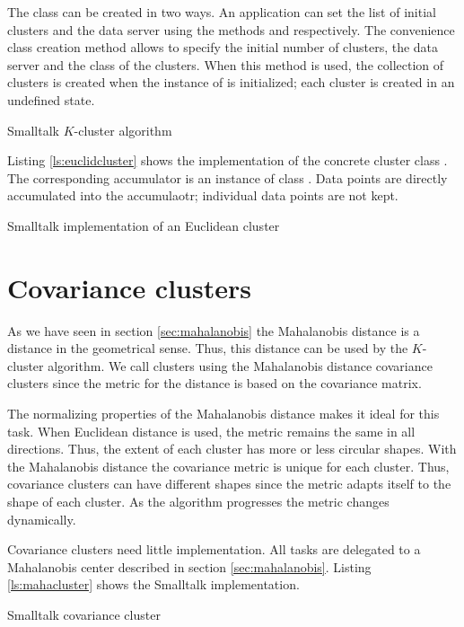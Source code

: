 The class  can be created in two ways. An
application can set the list of initial clusters and the data
server using the methods  and 
respectively. The convenience class creation method  allows to specify the initial number of
clusters, the data server and the class of the clusters.
When this method is used, the collection of clusters is created when the
instance of  is initialized; each cluster is
created in an undefined state.

\begin{listing} Smalltalk $K$-cluster algorithm \label{ls:clusterfinder}


\end{listing}
Listing \ref{ls:euclidcluster} shows the implementation of the
concrete cluster class .
The corresponding accumulator is an instance of class . Data points are directly accumulated into
the accumulaotr; individual data points are not kept.
\begin{listing} Smalltalk implementation of an Euclidean cluster \label{ls:euclidcluster}

\end{listing}

\section{Covariance clusters}
\label{sec:mahalanobiscluster} As we have seen in section
\ref{sec:mahalanobis} the Mahalanobis distance is a distance in
the geometrical sense. Thus, this distance can be used by the
$K$-cluster algorithm. We call clusters using the Mahalanobis
distance covariance clusters since the metric for the distance is
based on the covariance matrix.

The normalizing properties of the Mahalanobis distance makes it
ideal for this task. When Euclidean distance is used, the metric
remains the same in all directions. Thus, the extent of each
cluster has more or less circular shapes. With the Mahalanobis
distance the covariance metric is unique for each cluster. Thus,
covariance clusters can have different shapes since the metric
adapts itself to the shape of each cluster. As the algorithm
progresses the metric changes dynamically.

 Covariance clusters need little
implementation. 
All tasks are delegated to a Mahalanobis center described in section \ref{sec:mahalanobis}.
Listing \ref{ls:mahacluster} shows the Smalltalk implementation.

\begin{listing} Smalltalk covariance cluster \label{ls:mahacluster}

\end{listing}


